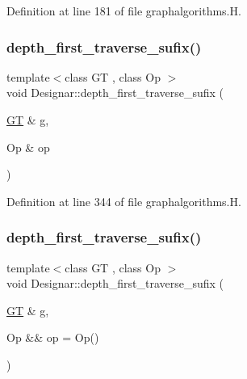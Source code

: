Definition at line 181 of file graphalgorithms.\+H.

\mbox{\label{namespace_designar_a91a3b6c7321dec6f2d9579721af465a1}} 
\subsubsection{\texorpdfstring{depth\+\_\+first\+\_\+traverse\+\_\+sufix()}{depth\_first\_traverse\_sufix()}\hspace{0.1cm}{\footnotesize\ttfamily [1/2]}}
{\footnotesize\ttfamily template$<$class GT , class Op $>$ \\
void Designar\+::depth\+\_\+first\+\_\+traverse\+\_\+sufix (\begin{DoxyParamCaption}\item[{\hyperlink{demo-buildgraph_8_c_a3001c40d2c31ca87ed96cd7d1334a55e}{GT} \&}]{g,  }\item[{Op \&}]{op }\end{DoxyParamCaption})}



Definition at line 344 of file graphalgorithms.\+H.

\mbox{\label{namespace_designar_ae742525c8bae623299150bcbcc317d6c}} 
\subsubsection{\texorpdfstring{depth\+\_\+first\+\_\+traverse\+\_\+sufix()}{depth\_first\_traverse\_sufix()}\hspace{0.1cm}{\footnotesize\ttfamily [2/2]}}
{\footnotesize\ttfamily template$<$class GT , class Op $>$ \\
void Designar\+::depth\+\_\+first\+\_\+traverse\+\_\+sufix (\begin{DoxyParamCaption}\item[{\hyperlink{demo-buildgraph_8_c_a3001c40d2c31ca87ed96cd7d1334a55e}{GT} \&}]{g,  }\item[{Op \&\&}]{op = {\ttfamily Op()} }\end{DoxyParamCaption})}



